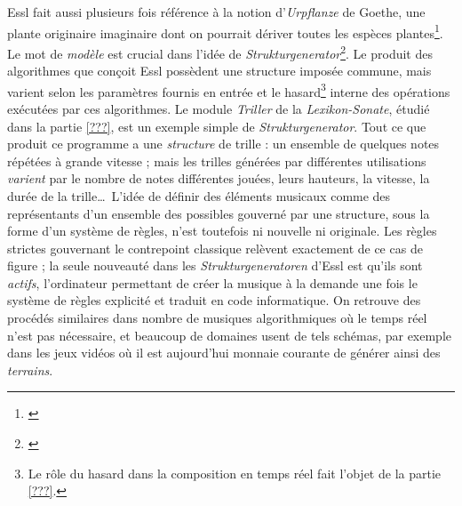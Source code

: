 \documentclass[a4paper,12pt]{article}
\begin{document}
Essl fait aussi plusieurs fois référence à la notion d'\emph{Urpflanze} de Goethe, une plante originaire imaginaire dont on pourrait dériver toutes les espèces plantes\footnote{\cite{goethe1993italienische}}. Le mot de \emph{modèle} est crucial dans l'idée de \emph{Strukturgenerator}\footnote{\cite{Strukturgeneratoren - Algorithmische Komposition in Echtzeit}}. Le produit des algorithmes que conçoit Essl possèdent une structure imposée commune, mais varient selon les paramètres fournis en entrée et le hasard\footnote{Le rôle du hasard dans la composition en temps réel fait l'objet de la partie \ref{???}.} interne des opérations exécutées par ces algorithmes. Le module \emph{Triller} de la \emph{Lexikon-Sonate}, étudié dans la partie \ref{???}, est un exemple simple de \emph{Strukturgenerator}. Tout ce que produit ce programme a une \emph{structure} de trille : un ensemble de quelques notes répétées à grande vitesse ; mais les trilles générées par différentes utilisations \emph{varient} par le nombre de notes différentes jouées, leurs hauteurs, la vitesse, la durée de la trille\dots~L'idée de définir des éléments musicaux comme des représentants d'un ensemble des possibles gouverné par une structure, sous la forme d'un système de règles, n'est toutefois ni nouvelle ni originale. Les règles strictes gouvernant le contrepoint classique relèvent exactement de ce cas de figure ; la seule nouveauté dans les \emph{Strukturgeneratoren} d'Essl est qu'ils sont \emph{actifs}, l'ordinateur permettant de créer la musique à la demande une fois le système de règles explicité et traduit en code informatique. On retrouve des procédés similaires dans nombre de musiques algorithmiques où le temps réel n'est pas nécessaire, et beaucoup de domaines usent de tels schémas, par exemple dans les jeux vidéos où il est aujourd'hui monnaie courante de générer ainsi des \emph{terrains}. \\
\end{document}
